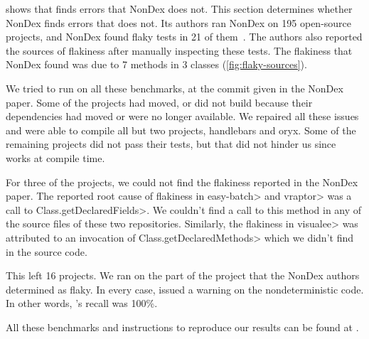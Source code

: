  shows that \theDeterminismChecker finds errors that NonDex does not.
This section determines whether NonDex finds errors that \theDeterminismChecker does not.
Its authors ran NonDex on 195 open-source projects, and NonDex found flaky tests in
21 of them~\cite{nondex}.
The authors also reported the sources of flakiness
after manually inspecting these tests. 
The flakiness that NonDex found was due to 7 methods in 3 classes (\cref{fig:flaky-sources}).

We tried to run \theDeterminismChecker on all these benchmarks, at the
commit given in the NonDex paper.
Some of the projects had moved, or did not build because their dependencies
had moved or were no longer available.  We repaired all these issues and
were able to compile all but two
projects, handlebars and oryx.  Some of the remaining projects did not pass
their tests, but that did not hinder us since \theDeterminismChecker works
at compile time.

For three of the projects, we could not find the flakiness reported in the
NonDex paper. The reported root cause of flakiness in \<easy-batch> and
\<vraptor> was a call to \<Class.getDeclaredFields>. We couldn't find a call
to this method in any of the source files of these two repositories.
Similarly, the flakiness in \<visualee> was attributed to an invocation of
\<Class.getDeclaredMethods> which we didn't find in the source code.

This left 16 projects.  We ran \theDeterminismChecker on the part of the
project that the NonDex authors determined as flaky.  In every case,
\theDeterminismChecker issued a warning on the nondeterministic code.  In
other words, \theDeterminismChecker's recall was 100\%.

All these benchmarks and instructions to reproduce our results can be found at .


